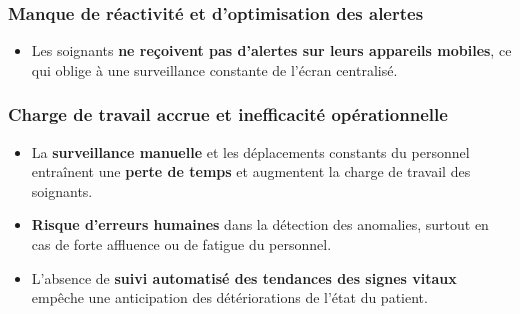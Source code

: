 
\subsubsection{Manque de réactivité et d’optimisation des alertes}
\begin{itemize}
    \item Les soignants \textbf{ne reçoivent pas d’alertes sur leurs appareils mobiles}, ce qui oblige à une surveillance constante de l’écran centralisé.
\end{itemize}

\subsubsection{Charge de travail accrue et inefficacité opérationnelle}
\begin{itemize}
    \item La \textbf{surveillance manuelle} et les déplacements constants du personnel entraînent une \textbf{perte de temps} et augmentent la charge de travail des soignants.
    \item \textbf{Risque d’erreurs humaines} dans la détection des anomalies, surtout en cas de forte affluence ou de fatigue du personnel.
    \item L'absence de \textbf{suivi automatisé des tendances des signes vitaux} empêche une anticipation des détériorations de l’état du patient.
\end{itemize}